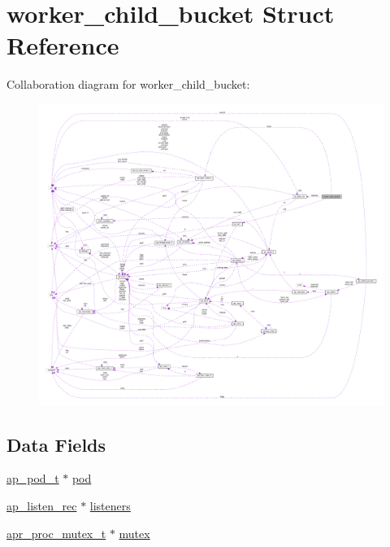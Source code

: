 \hypertarget{structworker__child__bucket}{}\section{worker\+\_\+child\+\_\+bucket Struct Reference}
\label{structworker__child__bucket}


Collaboration diagram for worker\+\_\+child\+\_\+bucket\+:
\nopagebreak
\begin{figure}[H]
\begin{center}
\leavevmode
\includegraphics[width=350pt]{structworker__child__bucket__coll__graph}
\end{center}
\end{figure}
\subsection*{Data Fields}
\begin{DoxyCompactItemize}
\item 
\hyperlink{structap__pod__t}{ap\+\_\+pod\+\_\+t} $\ast$ \hyperlink{structworker__child__bucket_a69d44e94f6c058194494b5af5a5f926c}{pod}
\item 
\hyperlink{structap__listen__rec}{ap\+\_\+listen\+\_\+rec} $\ast$ \hyperlink{structworker__child__bucket_a31a34f0b285d487b6b62feb38c41c624}{listeners}
\item 
\hyperlink{structapr__proc__mutex__t}{apr\+\_\+proc\+\_\+mutex\+\_\+t} $\ast$ \hyperlink{structworker__child__bucket_ad67ff3f3f8bb84de20fa4371227fe151}{mutex}
\end{DoxyCompactItemize}


